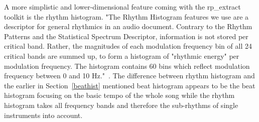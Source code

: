 A more simplistic and lower-dimensional feature coming with the rp\_extract toolkit is the rhythm histogram. "The Rhythm Histogram features we use are a descriptor for general rhythmics in an audio document. Contrary to the Rhythm Patterns and the Statistical Spectrum Descriptor, information is not stored per critical band. Rather, the magnitudes of each modulation frequency bin of all 24 critical bands are summed up, to form a histogram of "rhythmic energy" per modulation frequency. The histogram contains 60 bins which reflect modulation frequency between 0 and 10 Hz."~\cite[p. 3]{rp1}. 
The difference between rhythm histogram and the earlier in Section~\ref{beathist} mentioned beat histogram appears to be the beat histogram focusing on the basic tempo of the whole song while the rhythm histogram takes all frequency bands and therefore the sub-rhythms of single instruments into account. 

